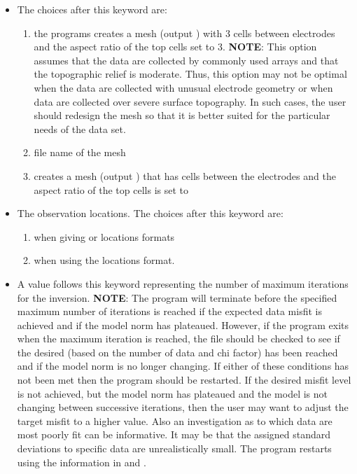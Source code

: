\begin{itemize}
%
\item[\fileName{MESH}] The choices after this keyword are: 
\begin{enumerate}
\item {} the programs creates a mesh (output ) with 3 cells between electrodes and the aspect ratio of the top cells set to 3. \textbf{NOTE}: This option assumes that the data are collected by commonly used arrays and that the topographic relief is moderate. Thus, this option may not be optimal when the data are collected with unusual electrode geometry or when data are collected over severe surface topography. In such cases, the user should redesign the mesh so that it is better suited for the particular needs of the data set. 
\item {} file name of the mesh
\item {} creates a mesh (output ) that has  cells between the electrodes and the aspect ratio of the top cells is set to 
\end{enumerate}
%
\item[\fileName{OBS}] The observation locations. The choices after this keyword are:
\begin{enumerate}
\item {} when giving  or  locations formats
\item {} when using the  locations format.
\end{enumerate}
%
\item [\fileName{NITER}] A value follows this keyword representing the number of maximum iterations for the inversion. \textbf{NOTE}: The program will terminate before the specified maximum number of iterations is reached if the expected data misfit is achieved and if the model norm has plateaued. However, if the program exits when the maximum iteration is reached, the file  should be checked to see if the desired  (based on the number of data and chi factor) has been reached and if the model norm is no longer changing. If either of these conditions has not been met then the program should be restarted. If the desired misfit level is not achieved, but the model norm has plateaued and the model is not changing between successive iterations, then the user may want to adjust the target misfit to a higher value. Also an investigation as to which data are most poorly fit can be informative. It may be that the assigned standard deviations to specific data are unrealistically small. The program restarts using the information in  and .

\end{itemize}
